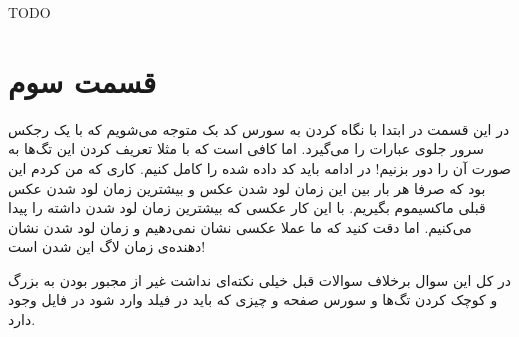 \documentclass[]{article}
\begin{document}
TODO
\section*{قسمت سوم}
در این قسمت در ابتدا با نگاه کردن به سورس کد بک متوجه می‌شویم که با یک رجکس سرور جلوی عبارات
را می‌گیرد. اما کافی است که با مثلا تعریف کردن این تگ‌ها به صورت
آن را دور بزنیم! در ادامه باید کد داده شده را کامل کنیم. کاری که من کردم این بود که صرفا
هر بار بین این زمان لود شدن عکس و بیشترین زمان لود شدن عکس قبلی ماکسیموم بگیریم. با این کار عکسی که
بیشترین زمان لود شدن داشته را پیدا می‌کنیم. اما دقت کنید که ما عملا عکسی نشان نمی‌دهیم و زمان لود شدن
نشان دهنده‌ی زمان لاگ این شدن است!

در کل این سوال برخلاف سوالات قبل خیلی نکته‌ای نداشت غیر از مجبور بودن به بزرگ و کوچک کردن تگ‌ها و سورس صفحه و چیزی که باید در فیلد وارد شود در فایل
وجود دارد.
\end{document}
